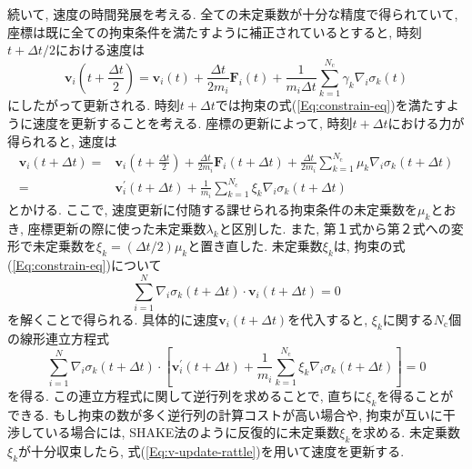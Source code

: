 続いて, 速度の時間発展を考える. 
全ての未定乗数が十分な精度で得られていて, 座標は既に全ての拘束条件を満たすように補正されているとすると, 時刻$t+\Delta t/2$における速度は
\begin{equation}
    \bm{v}_{i} \left(t + \frac{\Delta t}{2} \right)
    =
    \bm{v}_{i} (t)
    +
    \frac{\Delta t}{2m_{i}} \bm{F}_{i} (t)
    +
    \frac{1}{m_{i} \Delta t}
    \sum_{k=1}^{N_{\mathrm{c}}} \gamma_{k} \nabla_{i} \sigma_{k}(t)
\end{equation}
にしたがって更新される. 
時刻$t+\Delta t$では拘束の式(\ref{Eq:constrain-eq})を満たすように速度を更新することを考える. 
座標の更新によって, 時刻$t+\Delta t$における力が得られると, 速度は
\begin{align}
    \bm{v}_{i} (t + \Delta t)
    =&
    \bm{v}_{i} \left(t + \frac{\Delta t}{2}\right)
    +
    \frac{\Delta t}{2m_{i}} \bm{F}_{i}(t + \Delta t)
    +
    \frac{\Delta t}{2m_{i}}
    \sum_{k=1}^{N_\mathrm{c}} \mu_{k} \nabla_{i} \sigma_{k}(t + \Delta t)
    \\
    =&
    \bm{v}_{i}^{\prime} (t + \Delta t)
    +
    \frac{1}{m_{i}}
    \sum_{k=1}^{N_\mathrm{c}} \xi_{k} \nabla_{i} \sigma_{k}(t + \Delta t)
    \label{Eq:v-update-rattle}
\end{align}
とかける. 
ここで, 速度更新に付随する課せられる拘束条件の未定乗数を$\mu_{k}$とおき, 座標更新の際に使った未定乗数$\lambda_{k}$と区別した. 
また, 第１式から第２式への変形で未定乗数を$\xi_{k} = (\Delta t/2)\mu_{k}$と置き直した. 
未定乗数$\xi_{k}$は, 拘束の式(\ref{Eq:constrain-eq})について
\begin{equation}
    \sum_{i=1}^{N} \nabla_{i}\sigma_{k} (t + \Delta t)
    \cdot
    \bm{v}_{i} (t + \Delta t)
    = 0
\end{equation}
を解くことで得られる. 
具体的に速度$\bm{v}_{i}(t + \Delta t)$を代入すると, $\xi_{k}$に関する$N_{\mathrm{c}}$個の線形連立方程式
\begin{equation}
    \sum_{i=1}^{N} \nabla_{i}\sigma_{k} (t + \Delta t)
    \cdot
    \left[
        \bm{v}_{i}^{\prime} (t + \Delta t)
        +
        \frac{1}{m_{i}}
        \sum_{k=1}^{N_\mathrm{c}} \xi_{k} \nabla_{i} \sigma_{k}(t + \Delta t)
    \right]
    = 0
    \label{Eq:simeq-vel-constrain-multipliers}
\end{equation}
を得る. 
この連立方程式に関して逆行列を求めることで, 直ちに$\xi_{k}$を得ることができる. 
もし拘束の数が多く逆行列の計算コストが高い場合や, 拘束が互いに干渉している場合には, SHAKE法のように反復的に未定乗数$\xi_{k}$を求める. 
未定乗数$\xi_{k}$が十分収束したら, 式(\ref{Eq:v-update-rattle})を用いて速度を更新する. 


